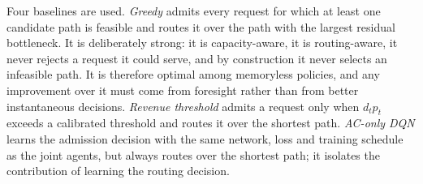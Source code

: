 \documentclass[10pt,journal,comsoc]{IEEEtran}
\begin{document}
Four baselines are used. \emph{Greedy} admits every request for which at
least one candidate path is feasible and routes it over the path with the
largest residual bottleneck. It is deliberately strong: it is
capacity-aware, it is routing-aware, it never rejects a request it could
serve, and by construction it never selects an infeasible path. It is
therefore optimal among memoryless policies, and any improvement over it
must come from foresight rather than from better instantaneous decisions.
\emph{Revenue threshold} admits a request only when $d_t p_t$ exceeds a
calibrated threshold and routes it over the shortest path. \emph{AC-only
DQN} learns the admission decision with the same network, loss and
training schedule as the joint agents, but always routes over the
shortest path; it isolates the contribution of learning the routing
decision.
\end{document}
